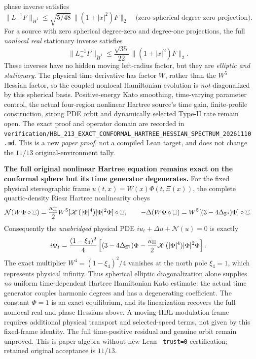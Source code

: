 \documentclass[11pt]{amsart}
\begin{document}
phase inverse satisfies
\[
 \|L_-^{-1}F\|_{\dot H^1}
 \le\sqrt{5/48}\,\|(1+|x|^2)F\|_2
 \quad\text{(zero spherical degree-zero projection).}
\]
For a source with zero spherical degree-zero and degree-one
projections, the full \emph{nonlocal real} stationary inverse
satisfies
\[
 \|L_+^{-1}F\|_{\dot H^1}
 \le\frac{\sqrt{35}}{22}\,\|(1+|x|^2)F\|_2.
\]
These inverses have no hidden moving left-radius factor, but they
are \emph{elliptic and stationary}. The physical time derivative
has factor \(W\), rather than the \(W^5\) Hessian factor, so the
coupled nonlocal Hamiltonian evolution is \emph{not} diagonalized
by this spherical basis. Positive-energy Kato smoothing,
time-varying parameter control, the actual four-region nonlinear
Hartree source's time gain, finite-profile construction, strong
PDE orbit and dynamically selected Type-II rate remain open.
The exact proof and operator domain are recorded in
\texttt{verification/HBL\_213\_EXACT\_CONFORMAL\_HARTREE\_HESSIAN\_SPECTRUM\_20261110.md}.
This is a new \emph{paper proof}, not a compiled Lean target,
and does not change the \(11/13\) original-environment tally.


\medskip
\noindent\textbf{The full original nonlinear Hartree equation remains exact on the conformal sphere but its time generator degenerates.}
For the fixed physical stereographic frame \(u(t,x)=W(x)\Phi(t,\Xi(x))\),
the complete quartic-density Riesz Hartree nonlinearity obeys
\[
 \mathcal N(W\Phi\circ\Xi)
 =\frac{\kappa_{\rm H}}2W^5
   [\mathscr K(|\Phi|^4)|\Phi|^2\Phi]\circ\Xi,\qquad
 -\Delta(W\Phi\circ\Xi)
 =W^5[(3-4\Delta_{\mathbb S^3})\Phi]\circ\Xi.
\]
Consequently the \emph{unabridged} physical PDE
\(iu_t+\Delta u+\mathcal N(u)=0\) is exactly
\[
 i\Phi_t=
 \frac{(1-\xi_4)^2}{4}\left[
 (3-4\Delta_{\mathbb S^3})\Phi
 -\frac{\kappa_{\rm H}}2
    \mathscr K(|\Phi|^4)|\Phi|^2\Phi\right].
\]
The exact multiplier \(W^4=(1-\xi_4)^2/4\) vanishes at
the north pole \(\xi_4=1\), which represents physical infinity.
Thus spherical elliptic diagonalization alone supplies
\emph{no} uniform time-dependent Hartree Hamiltonian Kato
estimate: the actual time generator couples harmonic degrees
and has a degenerating coefficient. The constant
\(\Phi=1\) is an exact equilibrium, and its linearization
recovers the full nonlocal real and phase Hessians above.
A moving HBL modulation frame requires additional physical
transport and selected-speed terms, not given by this fixed-frame
identity. The full time-positive residual and genuine orbit
remain unproved. This is paper algebra without new Lean
\texttt{--trust=0} certification; retained original acceptance
is \(11/13\).
\end{document}

